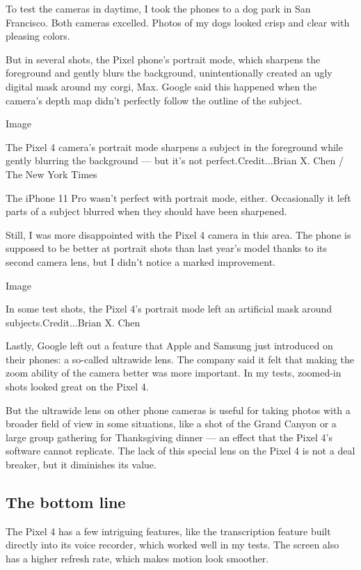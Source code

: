 To test the cameras in daytime, I took the phones to a dog park in San
Francisco. Both cameras excelled. Photos of my dogs looked crisp and
clear with pleasing colors.

But in several shots, the Pixel phone's portrait mode, which sharpens
the foreground and gently blurs the background, unintentionally created
an ugly digital mask around my corgi, Max. Google said this happened
when the camera's depth map didn't perfectly follow the outline of the
subject.

Image

The Pixel 4 camera's portrait mode sharpens a subject in the foreground
while gently blurring the background --- but it's not
perfect.Credit...Brian X. Chen / The New York Times

The iPhone 11 Pro wasn't perfect with portrait mode, either.
Occasionally it left parts of a subject blurred when they should have
been sharpened.

Still, I was more disappointed with the Pixel 4 camera in this area. The
phone is supposed to be better at portrait shots than last year's model
thanks to its second camera lens, but I didn't notice a marked
improvement.

Image

In some test shots, the Pixel 4's portrait mode left an artificial mask
around subjects.Credit...Brian X. Chen

Lastly, Google left out a feature that Apple and Samsung just introduced
on their phones: a so-called ultrawide lens. The company said it felt
that making the zoom ability of the camera better was more important. In
my tests, zoomed-in shots looked great on the Pixel 4.

But the ultrawide lens on other phone cameras is useful for taking
photos with a broader field of view in some situations, like a shot of
the Grand Canyon or a large group gathering for Thanksgiving dinner ---
an effect that the Pixel 4's software cannot replicate. The lack of this
special lens on the Pixel 4 is not a deal breaker, but it diminishes its
value.

\hypertarget{the-bottom-line}{%
\subsection{The bottom line}\label{the-bottom-line}}

The Pixel 4 has a few intriguing features, like the transcription
feature built directly into its voice recorder, which worked well in my
tests. The screen also has a higher refresh rate, which makes motion
look smoother.

